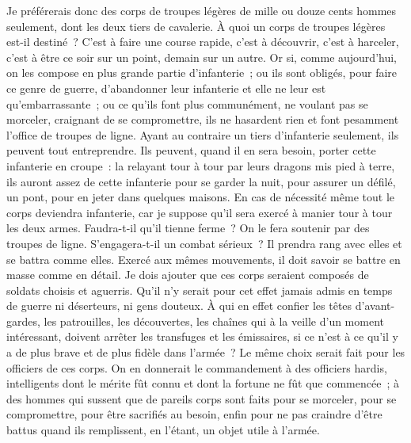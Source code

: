 \documentclass[french,twoside]{book} %
\begin{document}
Je préférerais donc des corps de troupes légères de mille ou douze cents hommes seulement, dont les deux tiers de cavalerie. À quoi un corps de troupes légères est-il destiné ? C’est à faire une course rapide, c’est à découvrir, c’est à harceler, c’est à être ce soir sur un point, demain sur un autre. Or si, comme aujourd’hui, on les compose en plus grande partie d’infanterie ; ou ils sont obligés, pour faire ce genre de guerre, d’abandonner leur infanterie et elle ne leur est qu’embarrassante ; ou ce qu’ils font plus communément, ne voulant pas se morceler, craignant de se compromettre, ils ne hasardent rien et font pesamment l’office de troupes de ligne. Ayant au contraire un tiers d’infanterie seulement, ils peuvent tout entreprendre. Ils peuvent, quand il en sera besoin, porter cette infanterie en croupe : la relayant tour à tour par leurs dragons mis pied à terre, ils auront assez de cette infanterie pour se garder la nuit, pour assurer un défilé, un pont, pour en jeter dans quelques maisons. En cas de nécessité même tout le corps deviendra infanterie, car je suppose qu’il sera exercé à manier tour à tour les deux armes. Faudra-t-il qu’il tienne ferme ? On le fera soutenir par des troupes de ligne. S’engagera-t-il un combat sérieux ? Il prendra rang avec elles et se battra comme elles. Exercé aux mêmes mouvements, il doit savoir se battre en masse comme en détail. Je dois ajouter que ces corps seraient composés de soldats choisis et aguerris. Qu’il n’y serait pour cet effet jamais admis en temps de guerre ni déserteurs, ni gens douteux. À qui en effet confier les têtes d’avant-gardes, les patrouilles, les découvertes, les chaînes qui à la veille d’un moment intéressant, doivent arrêter les transfuges et les émissaires, si ce n’est à ce qu’il y a de plus brave et de plus fidèle dans l’armée ? Le même choix serait fait pour les officiers de ces corps. On en donnerait le commandement à des officiers hardis, intelligents dont le mérite fût connu et dont la fortune ne fût que commencée ; à des hommes qui sussent que de pareils corps sont faits pour se morceler, pour se compromettre, pour être sacrifiés au besoin, enfin pour ne pas craindre d’être battus quand ils remplissent, en l’étant, un objet utile à l’armée.\par
\end{document}
